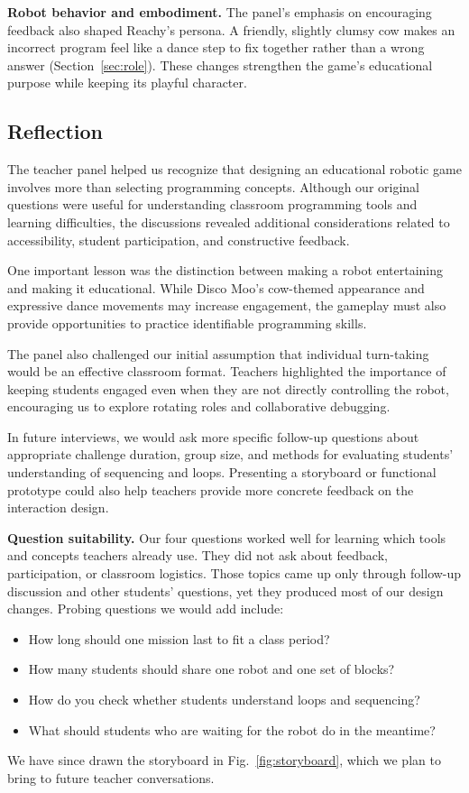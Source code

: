\documentclass[conference]{IEEEtran}
\begin{document}
\textbf{Robot behavior and embodiment.} The panel's emphasis on encouraging feedback also shaped Reachy's persona. A friendly, slightly clumsy cow makes an incorrect program feel like a dance step to fix together rather than a wrong answer (Section~\ref{sec:role}). These changes strengthen the game's educational purpose while keeping its playful character.

\subsection{Reflection}

The teacher panel helped us recognize that designing an educational robotic game involves more than selecting programming concepts. Although our original questions were useful for understanding classroom programming tools and learning difficulties, the discussions revealed additional considerations related to accessibility, student participation, and constructive feedback.

One important lesson was the distinction between making a robot entertaining and making it educational. While Disco Moo's cow-themed appearance and expressive dance movements may increase engagement, the gameplay must also provide opportunities to practice identifiable programming skills.

The panel also challenged our initial assumption that individual turn-taking would be an effective classroom format. Teachers highlighted the importance of keeping students engaged even when they are not directly controlling the robot, encouraging us to explore rotating roles and collaborative debugging.

In future interviews, we would ask more specific follow-up questions about appropriate challenge duration, group size, and methods for evaluating students' understanding of sequencing and loops. Presenting a storyboard or functional prototype could also help teachers provide more concrete feedback on the interaction design.

\textbf{Question suitability.} Our four questions worked well for learning which tools and concepts teachers already use. They did not ask about feedback, participation, or classroom logistics. Those topics came up only through follow-up discussion and other students' questions, yet they produced most of our design changes. Probing questions we would add include:
\begin{itemize}
    \item How long should one mission last to fit a class period?
    \item How many students should share one robot and one set of blocks?
    \item How do you check whether students understand loops and sequencing?
    \item What should students who are waiting for the robot do in the meantime?
\end{itemize}
We have since drawn the storyboard in Fig.~\ref{fig:storyboard}, which we plan to bring to future teacher conversations.
\end{document}
